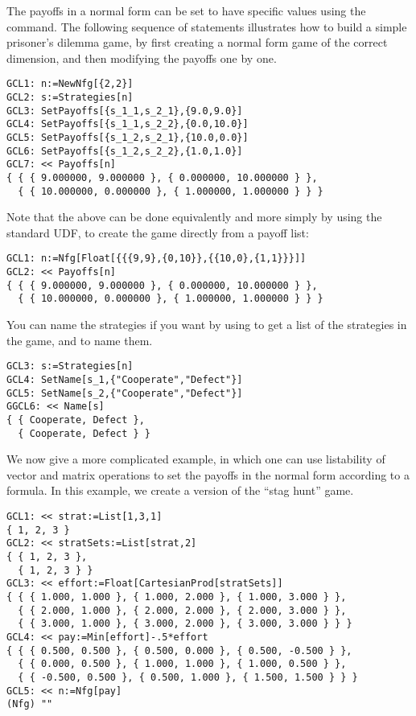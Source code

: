 The payoffs in a normal form can be set to have specific values using
the  command.  The following sequence of statements
illustrates how to build a simple prisoner's dilemma game, by first
creating a normal form game of the correct dimension, and then
modifying the payoffs one by one.  

\begin{verbatim}
GCL1: n:=NewNfg[{2,2}]
GCL2: s:=Strategies[n]
GCL3: SetPayoffs[{s_1_1,s_2_1},{9.0,9.0}]
GCL4: SetPayoffs[{s_1_1,s_2_2},{0.0,10.0}]
GCL5: SetPayoffs[{s_1_2,s_2_1},{10.0,0.0}]
GCL6: SetPayoffs[{s_1_2,s_2_2},{1.0,1.0}]
GCL7: << Payoffs[n]
{ { { 9.000000, 9.000000 }, { 0.000000, 10.000000 } },
  { { 10.000000, 0.000000 }, { 1.000000, 1.000000 } } }
\end{verbatim}

Note that the above can be done equivalently and more simply by using
the standard UDF,  to create the game directly from a payoff
list:

\begin{verbatim}
GCL1: n:=Nfg[Float[{{{9,9},{0,10}},{{10,0},{1,1}}}]]
GCL2: << Payoffs[n]
{ { { 9.000000, 9.000000 }, { 0.000000, 10.000000 } },
  { { 10.000000, 0.000000 }, { 1.000000, 1.000000 } } }
\end{verbatim}

\noindent
You can name the strategies if you want by using  to
get a list of the strategies in the game, and  to name
them.

\begin{verbatim}
GCL3: s:=Strategies[n]
GCL4: SetName[s_1,{"Cooperate","Defect"}]
GCL5: SetName[s_2,{"Cooperate","Defect"}]
GGCL6: << Name[s]
{ { Cooperate, Defect },
  { Cooperate, Defect } }
\end{verbatim}

We now give a more complicated example, in which one can use
listability of vector and matrix operations to set the payoffs in the
normal form according to a formula.  In this example, we create a
version of the ``stag hunt'' game.

\begin{verbatim}
GCL1: << strat:=List[1,3,1]
{ 1, 2, 3 }
GCL2: << stratSets:=List[strat,2]
{ { 1, 2, 3 },
  { 1, 2, 3 } }
GCL3: << effort:=Float[CartesianProd[stratSets]] 
{ { { 1.000, 1.000 }, { 1.000, 2.000 }, { 1.000, 3.000 } },
  { { 2.000, 1.000 }, { 2.000, 2.000 }, { 2.000, 3.000 } },
  { { 3.000, 1.000 }, { 3.000, 2.000 }, { 3.000, 3.000 } } }
GCL4: << pay:=Min[effort]-.5*effort
{ { { 0.500, 0.500 }, { 0.500, 0.000 }, { 0.500, -0.500 } },
  { { 0.000, 0.500 }, { 1.000, 1.000 }, { 1.000, 0.500 } },
  { { -0.500, 0.500 }, { 0.500, 1.000 }, { 1.500, 1.500 } } }
GCL5: << n:=Nfg[pay]
(Nfg) ""
\end{verbatim}


